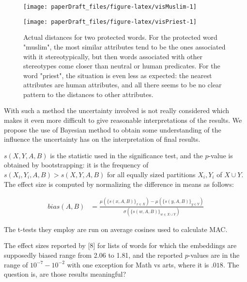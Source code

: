 \documentclass[
  12pt,
  dvipsnames,enabledeprecatedfontcommands]{scrartcl}
\begin{document}
\begin{figure}[H]

\begin{center}\texttt{[image: paperDraft\_files/figure-latex/visMuslim-1]} \end{center}





\begin{center}\texttt{[image: paperDraft\_files/figure-latex/visPriest-1]} \end{center}

\caption{Actual distances for two protected words. For the protected word "muslim", the most similar attributes tend to be the ones associated with it stereotypically, but then words associated with other stereotypes come closer than neutral or human predicates. For the word "priest", the situation is even less as expected: the nearest attributes are human attributes, and all there seems to be no clear pattern to the distances to other attributes.}
\end{figure}

With such a method the uncertainty involved is not really considered
which makes it even more difficult to give reasonable interpretations of
the results. We propose the use of Bayesian method to obtain some
understanding of the influence the uncertainty has on the interpretation
of final results.

\noindent \(s(X,Y,A,B)\) is the statistic used in the significance test,
and the \(p\)-value is obtained by bootstrapping: it is the frequency of
\(s(X_i,Y_i,A,B)>s(X,Y,A,B)\) for all equally sized partitions
\(X_i, Y_i\) of \(X\cup Y\). The effect size is computed by normalizing
the difference in means as follows:

\vspace{-2mm}

\footnotesize

\begin{align}
bias(A,B) & = \frac{
\mu(\{s(x,A,B)\}_{x\in X}) -\mu(\{s(y,A,B)\}_{y\in Y}) 
}{
\sigma(\{s(w,A,B)\}_{w\in X\cup Y})
}
\end{align}

\normalsize

The t-tests they employ are run on average cosines used to calculate
\textsf{MAC}.

The effect sizes reported by {[}8{]} for lists of words for which the
embeddings are supposedly biased range from 2.06 to 1.81, and the
reported \(p\)-values are in the range of \(10^{-7}-10^{-2}\) with one
exception for Math vs arts, where it is \(.018\). The question is, are
those results meaningful?
\end{document}
